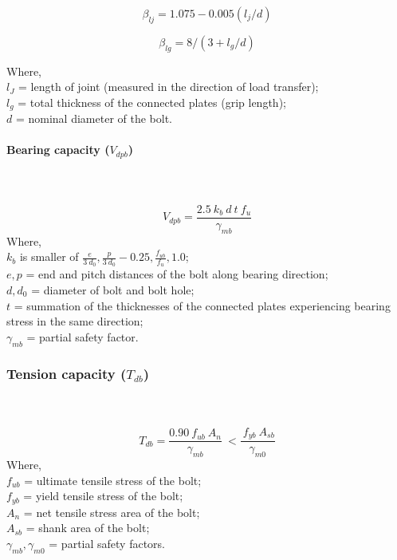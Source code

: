 \documentclass[11.5pt,a4paper,oneside]{report}
\begin{document}
\begin{Form}
\begin{equation}
	\beta_{lj} = 1.075 - 0.005(l_j/d)
\end{equation}

\begin{equation}
	\beta_{lg} = 8/(3 + l_g/d)
\end{equation}

Where, \\
\indent $l_J$ = length of joint (measured in the direction of load transfer); \\
\indent $l_g$ = total thickness of the connected plates (grip length); \\
\indent $d$ = nominal diameter of the bolt. \\
\paragraph{Bearing capacity (\boldmath $V_{dpb}$)}
\qquad \qquad [Reference: Cl. 10.3.4, IS 800:2007] \\ \\
\label{bearing_capacity}
\begin{equation}
	V_{dpb} = \frac{2.5~ k_b~ d~ t~ f_u}{\gamma_{mb}}
\end{equation}
Where, \\
\indent $k_b$ is smaller of $\frac{e}{3~d_0}, \frac{p}{3~d_0} - 0.25, \frac{f_{ub}}{f_u}, 1.0$; \\
\indent $e, p$ = end and pitch distances of the bolt along bearing direction; \\
\indent $d, d_0$ = diameter of bolt and bolt hole; \\
\indent $t$ = summation of the thicknesses of the connected plates experiencing bearing stress in the same direction; \\
\indent $\gamma_{mb}$ = partial safety factor.
\subsubsection{Tension capacity (\boldmath $T_{db}$)}
\qquad \qquad [Reference: Cl. 10.3.5, IS 800:2007] \\ \\
\begin{equation}
T_{db} = \frac{0.90~ f_{ub}~ A_n}{\gamma_{mb}}~ < \frac{~f_{yb}~ A_{sb}}{\gamma_{m0}}
\end{equation}
Where, \\
\indent $f_{ub}$ = ultimate tensile stress of the bolt; \\
\indent $f_{yb}$ = yield tensile stress of the bolt; \\
\indent $A_n$ = net tensile stress area of the bolt; \\
\indent $A_{sb}$ = shank area of the bolt; \\
\indent $\gamma_{mb}, \gamma_{m0}$ = partial safety factors. \\

\end{Form}
\end{document}
